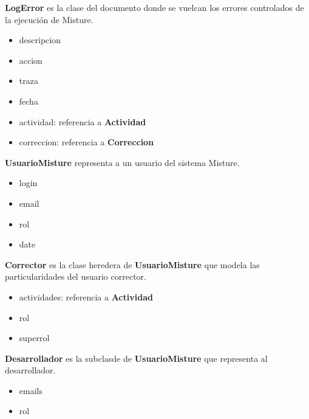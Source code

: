 \begin{description}
\item \textbf{LogError} es la clase del documento donde se vuelcan los errores controlados de la ejecución de Misture.
\begin{itemize}
\item descripcion
\item accion
\item traza
\item fecha
\item actividad: referencia a \textbf{Actividad}
\item correccion: referencia a \textbf{Correccion}
\end{itemize}
\item \textbf{UsuarioMisture} representa a un usuario del sistema Misture.
\begin{itemize}
\item login
\item email
\item rol
\item date
\end{itemize}
\item \textbf{Corrector} es la clase heredera de \textbf{UsuarioMisture} que modela las particularidades del usuario corrector.
\begin{itemize}
\item actividades: referencia a \textbf{Actividad}
\item rol
\item superrol
\end{itemize}
\item \textbf{Desarrollador} es la subclasde de \textbf{UsuarioMisture} que representa al desarrollador.
\begin{itemize}
\item emails
\item rol
\end{itemize}
\item \textbf{}


\end{description}
